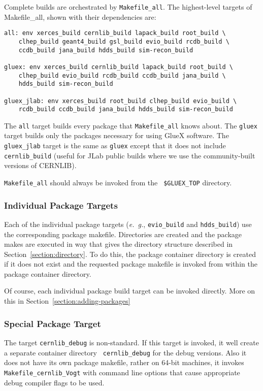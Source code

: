 \documentclass[12pt]{article}
\begin{document}
Complete builds are orchestrated by {\tt Makefile\_all}. The highest-level
targets of Makefile\_all, shown with their dependencies are:

\begin{verbatim}
all: env xerces_build cernlib_build lapack_build root_build \
    clhep_build geant4_build gsl_build evio_build rcdb_build \
    ccdb_build jana_build hdds_build sim-recon_build

gluex: env xerces_build cernlib_build lapack_build root_build \
    clhep_build evio_build rcdb_build ccdb_build jana_build \
    hdds_build sim-recon_build

gluex_jlab: env xerces_build root_build clhep_build evio_build \
    rcdb_build ccdb_build jana_build hdds_build sim-recon_build
\end{verbatim}

The {\tt all} target builds every package that {\tt Makefile\_all} knows
about. The {\tt gluex} target builds only the packages necessary for
using GlueX software. The {\tt gluex\_jlab} target is the same as {\tt gluex}
except that it does not include {\tt cernlib\_build} (useful for JLab public
builds where we use the community-built versions of CERNLIB).

{{\tt Makefile\_all}} should always be invoked from the {\tt
  \$GLUEX\_TOP} directory.

\subsubsection{Individual Package Targets}

Each of the individual package targets ({\it e.~g.}, {\tt evio\_build}
and {\tt hdds\_build}) use the corresponding package
makefile. Directories are created and the package makes are executed
in way that gives the directory structure described in
Section~\ref{section:directory}. To do this, the package container
directory is created if it does not exist and the requested package
makefile is invoked from within the package container directory.

Of course, each individual package build target can be invoked
directly. More on this in Section~\ref{section:adding-packages}

\subsubsection{Special Package Target}

The target {\tt cernlib\_debug} is non-standard. If this target is
invoked, it well create a separate container directory {\tt
  cernlib\_debug} for the debug versions. Also it does not have its
own package makefile, rather on 64-bit machines, it invokes {\tt
  Makefile\_cernlib\_Vogt} with command line options that cause
appropriate debug compiler flags to be used.
\end{document}
